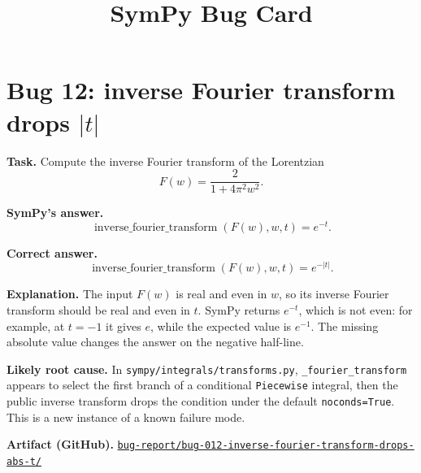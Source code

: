 \documentclass[11pt]{article}
\title{SymPy Bug Card}
\author{}
\date{}
\newcommand{\artifactrepo}{https://github.com/TODO-org/TODO-repo}
\newcommand{\bugbundle}[1]{\href{\artifactrepo/tree/main/bug-report/#1}{\nolinkurl{bug-report/#1/}}}
\begin{document}
\maketitle

\section*{Bug 12: inverse Fourier transform drops \texorpdfstring{$|t|$}{Abs(t)}}

\begin{counterexamplebox}
\textbf{Task.} Compute the inverse Fourier transform of the Lorentzian
\[
  F(w)=\frac{2}{1+4\pi^2w^2}.
\]

\medskip
\textbf{SymPy's answer.}
\[
  \operatorname{inverse\_fourier\_transform}(F(w),w,t)=e^{-t}.
\]

\medskip
\textbf{Correct answer.}
\[
  \operatorname{inverse\_fourier\_transform}(F(w),w,t)=e^{-|t|}.
\]

\medskip
\textbf{Explanation.} The input \(F(w)\) is real and even in \(w\), so its
inverse Fourier transform should be real and even in \(t\).  SymPy returns
\(e^{-t}\), which is not even: for example, at \(t=-1\) it gives \(e\), while
the expected value is \(e^{-1}\).  The missing absolute value changes the
answer on the negative half-line.

\medskip
\textbf{Likely root cause.} In
\nolinkurl{sympy/integrals/transforms.py}, \texttt{\_fourier\_transform}
appears to select the first branch of a conditional \texttt{Piecewise} integral,
then the public inverse transform drops the condition under the default
\texttt{noconds=True}.  This is a new instance of a known failure mode. 

\medskip
\textbf{Artifact (GitHub).} \bugbundle{bug-012-inverse-fourier-transform-drops-abs-t}
\end{counterexamplebox}
\end{document}
